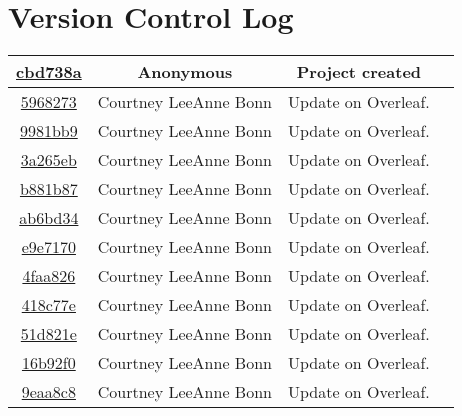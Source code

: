 \documentclass[letterpaper,10pt,draftclsnofoot,onecolumn,titlepage]{IEEEtran}
\begin{document}
\section{Version Control Log}
\begin{center}
\begin{tabular}{ c c c l }
\href{https://github.com/courtbonn/CS-444/commit/cbd738a2355f41b47f0d5739d338addd0ff899d7}{cbd738a} & Anonymous & Project created\\\hline
\href{https://github.com/courtbonn/CS-444/commit/5968273bdc6f20c0eb2663c1745a8bee7cf91cbf}{5968273} & Courtney LeeAnne Bonn & Update on Overleaf.\\\hline
\href{https://github.com/courtbonn/CS-444/commit/9981bb915b8a7527475b770e2db4c4bb109f9af4}{9981bb9} & Courtney LeeAnne Bonn & Update on Overleaf.\\\hline
\href{https://github.com/courtbonn/CS-444/commit/3a265eb2f153abc0c3369c2756959ac0f289dda5}{3a265eb} & Courtney LeeAnne Bonn & Update on Overleaf.\\\hline
\href{https://github.com/courtbonn/CS-444/commit/b881b87efb0d55bbbec6b6e654de9e2ffedec317}{b881b87} & Courtney LeeAnne Bonn & Update on Overleaf.\\\hline
\href{https://github.com/courtbonn/CS-444/commit/ab6bd34b735418c82bf530d468d4ca8a579b5300}{ab6bd34} & Courtney LeeAnne Bonn & Update on Overleaf.\\\hline
\href{https://github.com/courtbonn/CS-444/commit/e9e7170448700563c8637ea905a8e1ea3467f11a}{e9e7170} & Courtney LeeAnne Bonn & Update on Overleaf.\\\hline
\href{https://github.com/courtbonn/CS-444/commit/4faa8268e3d1abeb8f3c1e4c2e2416ea90e6b1a8}{4faa826} & Courtney LeeAnne Bonn & Update on Overleaf.\\\hline
\href{https://github.com/courtbonn/CS-444/commit/418c77e69e2084e7694265a9bd074084f0ac1ba1}{418c77e} & Courtney LeeAnne Bonn & Update on Overleaf.\\\hline
\href{https://github.com/courtbonn/CS-444/commit/51d821ecc4c679b7e7f43d1c07506ebf55355e3c}{51d821e} & Courtney LeeAnne Bonn & Update on Overleaf.\\\hline
\href{https://github.com/courtbonn/CS-444/commit/16b92f0569ebc397a3cf0241e3c8d4e9618baf2c}{16b92f0} & Courtney LeeAnne Bonn & Update on Overleaf.\\\hline
\href{https://github.com/courtbonn/CS-444/commit/9eaa8c8057de569871bcf5df88fc642071a9cd5a}{9eaa8c8} & Courtney LeeAnne Bonn & Update on Overleaf.\\\hline

\end{tabular}
\end{center}
\end{document}
